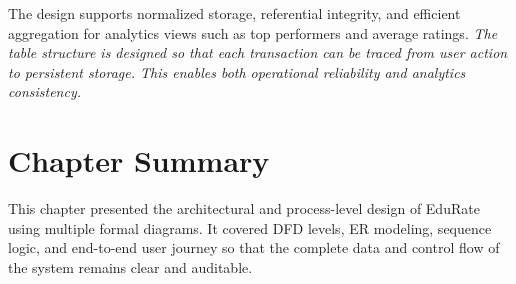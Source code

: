 The design supports normalized storage, referential integrity, and efficient aggregation for analytics views such as top performers and average ratings.
\noindent\textit{The table structure is designed so that each transaction can be traced from user action to persistent storage. This enables both operational reliability and analytics consistency.}

\section*{Chapter Summary}
This chapter presented the architectural and process-level design of EduRate using multiple formal diagrams. It covered DFD levels, ER modeling, sequence logic, and end-to-end user journey so that the complete data and control flow of the system remains clear and auditable.
